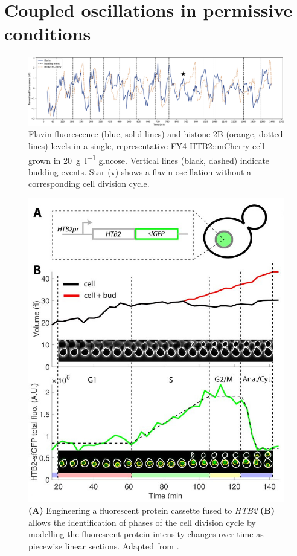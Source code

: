 \section{Coupled oscillations in permissive conditions}
\label{sec:biology-sync}

\begin{figure}
  \centering
    \includegraphics[width=1.0\linewidth]{single_birth_plot_edit.pdf}
    \caption{
      Flavin fluorescence (blue, solid lines) and histone 2B (orange, dotted lines) levels in a single, representative FY4 HTB2::mCherry cell grown in \SI{20}{\gram~\litre^{-1}} glucose.
      Vertical lines (black, dashed) indicate budding events.
      Star ($\star$) shows a flavin oscillation without a corresponding cell division cycle.
    }
  \label{fig:biology-highglc-single}
\end{figure}


\begin{figure}
  \centering
    \includegraphics[width=0.5\linewidth]{garmendia-torresMultipleInputsEnsure2018_1_adapted.jpg}
    \caption{
      \textbf{(A)} Engineering a fluorescent protein cassette fused to \textit{HTB2} \textbf{(B)} allows the identification of phases of the cell division cycle by modelling the fluorescent protein intensity changes over time as piecewise linear sections.
      Adapted from \textcite{garmendia-torresMultipleInputsEnsure2018}.
    }
  \label{fig:biology-htb2}
\end{figure}

